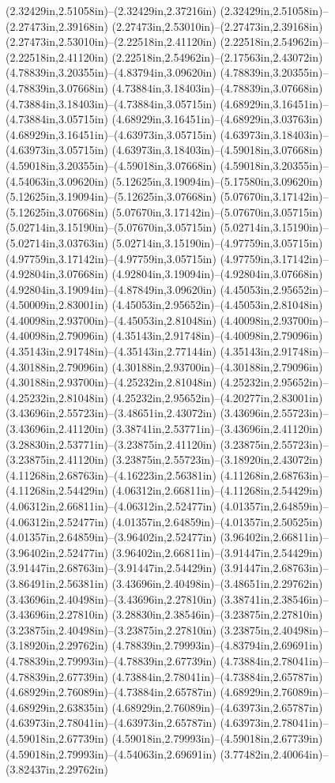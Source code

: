 (2.32429in,2.51058in)--(2.32429in,2.37216in) (2.32429in,2.51058in)--(2.27473in,2.39168in) (2.27473in,2.53010in)--(2.27473in,2.39168in) (2.27473in,2.53010in)--(2.22518in,2.41120in) (2.22518in,2.54962in)--(2.22518in,2.41120in) (2.22518in,2.54962in)--(2.17563in,2.43072in) (4.78839in,3.20355in)--(4.83794in,3.09620in) (4.78839in,3.20355in)--(4.78839in,3.07668in) (4.73884in,3.18403in)--(4.78839in,3.07668in) (4.73884in,3.18403in)--(4.73884in,3.05715in) (4.68929in,3.16451in)--(4.73884in,3.05715in) (4.68929in,3.16451in)--(4.68929in,3.03763in) (4.68929in,3.16451in)--(4.63973in,3.05715in) (4.63973in,3.18403in)--(4.63973in,3.05715in) (4.63973in,3.18403in)--(4.59018in,3.07668in) (4.59018in,3.20355in)--(4.59018in,3.07668in) (4.59018in,3.20355in)--(4.54063in,3.09620in) (5.12625in,3.19094in)--(5.17580in,3.09620in) (5.12625in,3.19094in)--(5.12625in,3.07668in) (5.07670in,3.17142in)--(5.12625in,3.07668in) (5.07670in,3.17142in)--(5.07670in,3.05715in) (5.02714in,3.15190in)--(5.07670in,3.05715in) (5.02714in,3.15190in)--(5.02714in,3.03763in) (5.02714in,3.15190in)--(4.97759in,3.05715in) (4.97759in,3.17142in)--(4.97759in,3.05715in) (4.97759in,3.17142in)--(4.92804in,3.07668in) (4.92804in,3.19094in)--(4.92804in,3.07668in) (4.92804in,3.19094in)--(4.87849in,3.09620in) (4.45053in,2.95652in)--(4.50009in,2.83001in) (4.45053in,2.95652in)--(4.45053in,2.81048in) (4.40098in,2.93700in)--(4.45053in,2.81048in) (4.40098in,2.93700in)--(4.40098in,2.79096in) (4.35143in,2.91748in)--(4.40098in,2.79096in) (4.35143in,2.91748in)--(4.35143in,2.77144in) (4.35143in,2.91748in)--(4.30188in,2.79096in) (4.30188in,2.93700in)--(4.30188in,2.79096in) (4.30188in,2.93700in)--(4.25232in,2.81048in) (4.25232in,2.95652in)--(4.25232in,2.81048in) (4.25232in,2.95652in)--(4.20277in,2.83001in) (3.43696in,2.55723in)--(3.48651in,2.43072in) (3.43696in,2.55723in)--(3.43696in,2.41120in) (3.38741in,2.53771in)--(3.43696in,2.41120in) (3.28830in,2.53771in)--(3.23875in,2.41120in) (3.23875in,2.55723in)--(3.23875in,2.41120in) (3.23875in,2.55723in)--(3.18920in,2.43072in) (4.11268in,2.68763in)--(4.16223in,2.56381in) (4.11268in,2.68763in)--(4.11268in,2.54429in) (4.06312in,2.66811in)--(4.11268in,2.54429in) (4.06312in,2.66811in)--(4.06312in,2.52477in) (4.01357in,2.64859in)--(4.06312in,2.52477in) (4.01357in,2.64859in)--(4.01357in,2.50525in) (4.01357in,2.64859in)--(3.96402in,2.52477in) (3.96402in,2.66811in)--(3.96402in,2.52477in) (3.96402in,2.66811in)--(3.91447in,2.54429in) (3.91447in,2.68763in)--(3.91447in,2.54429in) (3.91447in,2.68763in)--(3.86491in,2.56381in) (3.43696in,2.40498in)--(3.48651in,2.29762in) (3.43696in,2.40498in)--(3.43696in,2.27810in) (3.38741in,2.38546in)--(3.43696in,2.27810in) (3.28830in,2.38546in)--(3.23875in,2.27810in) (3.23875in,2.40498in)--(3.23875in,2.27810in) (3.23875in,2.40498in)--(3.18920in,2.29762in) (4.78839in,2.79993in)--(4.83794in,2.69691in) (4.78839in,2.79993in)--(4.78839in,2.67739in) (4.73884in,2.78041in)--(4.78839in,2.67739in) (4.73884in,2.78041in)--(4.73884in,2.65787in) (4.68929in,2.76089in)--(4.73884in,2.65787in) (4.68929in,2.76089in)--(4.68929in,2.63835in) (4.68929in,2.76089in)--(4.63973in,2.65787in) (4.63973in,2.78041in)--(4.63973in,2.65787in) (4.63973in,2.78041in)--(4.59018in,2.67739in) (4.59018in,2.79993in)--(4.59018in,2.67739in) (4.59018in,2.79993in)--(4.54063in,2.69691in) (3.77482in,2.40064in)--(3.82437in,2.29762in) 